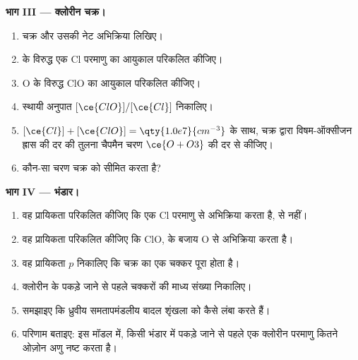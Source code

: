 \begin{problem}
\medskip\noindent\textbf{भाग III --- क्लोरीन चक्र।}
\begin{enumerate}[resume]
  \item चक्र और उसकी नेट अभिक्रिया लिखिए।
  \item {} के विरुद्ध एक Cl परमाणु का आयुकाल परिकलित कीजिए।
  \item O के विरुद्ध ClO का आयुकाल परिकलित कीजिए।
  \item स्थायी अनुपात $[\ce{ClO}]/[\ce{Cl}]$ निकालिए।
  \item $[\ce{Cl}] + [\ce{ClO}] = \qty{1.0e7}{cm^{-3}}$ के साथ, चक्र द्वारा विषम-ऑक्सीजन ह्रास की दर की तुलना
        चैपमैन चरण $\ce{O + O3}$ की दर से कीजिए।
  \item कौन-सा चरण चक्र को सीमित करता है?
\end{enumerate}

\medskip\noindent\textbf{भाग IV --- भंडार।}
\begin{enumerate}[resume]
  \item वह प्रायिकता परिकलित कीजिए कि एक Cl परमाणु  से अभिक्रिया करता है,
         से नहीं।
  \item वह प्रायिकता परिकलित कीजिए कि ClO,  के बजाय O से अभिक्रिया करता है।
  \item वह प्रायिकता $p$ निकालिए कि चक्र का एक चक्कर पूरा होता है।
  \item क्लोरीन के पकड़े जाने से पहले चक्करों की माध्य संख्या निकालिए।
  \item समझाइए कि ध्रुवीय समतापमंडलीय बादल शृंखला को कैसे लंबा करते हैं।
  \item परिणाम बताइए: इस मॉडल में, किसी भंडार में पकड़े जाने से पहले एक क्लोरीन परमाणु
        कितने ओज़ोन अणु नष्ट करता है।
\end{enumerate}
\end{problem}
